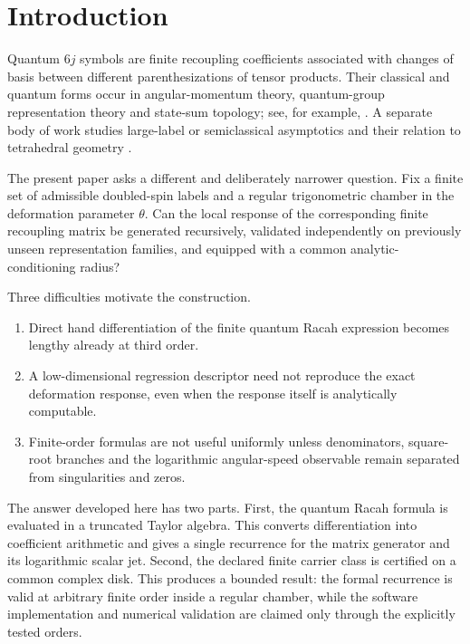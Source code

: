 \section{Introduction}
Quantum $6j$ symbols are finite recoupling coefficients associated with changes of basis between different parenthesizations of tensor products.  Their classical and quantum forms occur in angular-momentum theory, quantum-group representation theory and state-sum topology; see, for example, \cite{biedenharnLouck1981,kirillovReshetikhin1989,turaevViro1992}.  A separate body of work studies large-label or semiclassical asymptotics and their relation to tetrahedral geometry \cite{ponzanoRegge1968,roberts1999,taylorWoodward2005}.

The present paper asks a different and deliberately narrower question.  Fix a finite set of admissible doubled-spin labels and a regular trigonometric chamber in the deformation parameter $\theta$.  Can the local response of the corresponding finite recoupling matrix be generated recursively, validated independently on previously unseen representation families, and equipped with a common analytic-conditioning radius?

Three difficulties motivate the construction.
\begin{enumerate}[label=(\roman*)]
\item Direct hand differentiation of the finite quantum Racah expression becomes lengthy already at third order.
\item A low-dimensional regression descriptor need not reproduce the exact deformation response, even when the response itself is analytically computable.
\item Finite-order formulas are not useful uniformly unless denominators, square-root branches and the logarithmic angular-speed observable remain separated from singularities and zeros.
\end{enumerate}

The answer developed here has two parts.  First, the quantum Racah formula is evaluated in a truncated Taylor algebra.  This converts differentiation into coefficient arithmetic and gives a single recurrence for the matrix generator and its logarithmic scalar jet.  Second, the declared finite carrier class is certified on a common complex disk.  This produces a bounded result: the formal recurrence is valid at arbitrary finite order inside a regular chamber, while the software implementation and numerical validation are claimed only through the explicitly tested orders.


